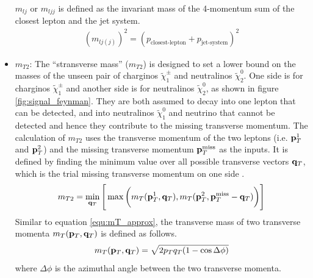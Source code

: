 \begin{itemize}
$m_{lj}$ or $m_{ljj}$ is defined as the invariant mass of the 4-momentum sum of the closest lepton and the jet system.
\begin{align}
(m_{lj(j)})^2 = (p_{\text{closest-lepton}} + p_{\text{jet-system}})^2
\end{align}

\item $m_{T2}$:
The ``stransverse mass'' ($m_{T2}$) is designed to set a lower bound on the masses of the unseen pair of charginos $\tilde{\chi}_1^\pm$ and neutralinos $\tilde{\chi}_2^0$.
One side is for charginos $\tilde{\chi}_1^\pm$ and another side is for neutralinos $\tilde{\chi}_2^0$, as shown in figure \ref{fig:signal_feynman}.
They are both assumed to decay into one lepton that can be detected, and into neutralinos $\tilde{\chi}_1^0$ and neutrino that cannot be detected and hence they contribute to the missing transverse momentum.
The calculation of $m_{T2}$ uses the transverse momentum of the two leptons (i.e. ${\bf p}_T^1$ and ${\bf p}_T^2$) and the missing transverse momentum ${\bf p}_T^{\text{miss}}$ as the inputs.
It is defined by finding the minimum value over all possible transverse vectors ${\bf q}_T$, which is the trial missing transverse momentum on one side \cite{MT2}.
\begin{equation}
m_{T2} = \min_{{\bf q}_T} \Bigg[ \max \bigg( m_T( {\bf p}_T^1, {\bf q}_T ), m_T( {\bf p}_T^2, {\bf p}_T^{\text{miss}} - {\bf q}_T ) \bigg) \Bigg]
\end{equation}
Similar to equation \ref{equ:mT_approx}, the transverse mass of two transverse momenta $m_T( {\bf p}_T, {\bf q}_T )$ is defined as follows.
\begin{equation}
m_T( {\bf p}_T, {\bf q}_T ) = \sqrt{ 2 p_T q_T ( 1 - \cos{\Delta\phi} ) }
\end{equation}
where $\Delta\phi$ is the azimuthal angle between the two transverse momenta.
\end{itemize}

